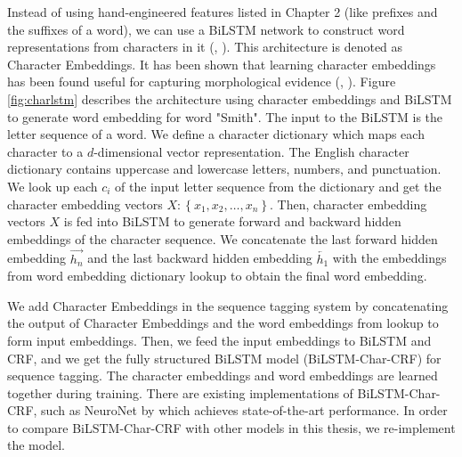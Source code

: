 Instead of using hand-engineered features listed in Chapter 2 (like prefixes and the suffixes of a word), we can use a BiLSTM network to construct word representations from characters in it (\citeauthor{lample2016neural}, \citeyear{lample2016neural}). This architecture is denoted as Character Embeddings. It has been shown that learning character embeddings has been found useful for capturing morphological evidence (\citeauthor{ling2015finding}, \citeyear{ling2015finding}). Figure \ref{fig:charlstm} describes the architecture using character embeddings and BiLSTM to generate word embedding for word "Smith". The input to the BiLSTM is the letter sequence of a word. We define a character dictionary which maps each character to a $d$-dimensional vector representation. The English character dictionary contains uppercase and lowercase letters, numbers, and punctuation. We look up each $c_{i}$ of the input letter sequence from the dictionary and get the character embedding vectors $X:\left\{x_{1},x_{2},\dots,x_{n}\right\}$. Then, character embedding vectors $X$ is fed into BiLSTM to generate forward and backward hidden embeddings of the character sequence. We concatenate the last forward hidden embedding $\overrightarrow {h_{n}}$ and the last backward hidden embedding $\overleftarrow {h_{1}}$ with the embeddings from word embedding dictionary lookup to obtain the final word embedding.

We add Character Embeddings in the sequence tagging system by concatenating the output of Character Embeddings and the word embeddings from lookup to form input embeddings. Then, we feed the input embeddings to BiLSTM and CRF, and we get the fully structured BiLSTM model (BiLSTM-Char-CRF) for sequence tagging. The character embeddings and word embeddings are learned together during training. There are existing implementations of BiLSTM-Char-CRF, such as NeuroNet by \cite{2017neuroner} which achieves state-of-the-art performance. In order to compare BiLSTM-Char-CRF with other models in this thesis, we re-implement the model.


